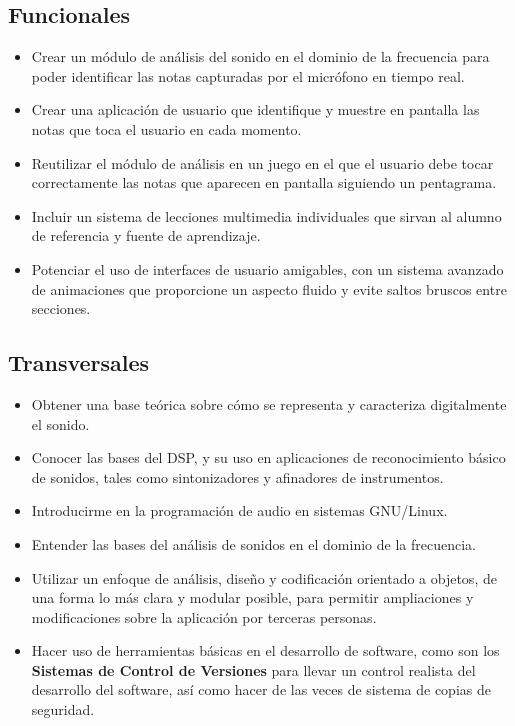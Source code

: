 \subsection{Funcionales}
\begin{itemize}
\item Crear un módulo de análisis del sonido en el dominio de la
  frecuencia para poder identificar las notas capturadas por el
  micrófono en tiempo real.
\item Crear una aplicación de usuario que identifique y muestre en
  pantalla las notas que toca el usuario en cada momento.
\item Reutilizar el módulo de análisis en un juego en el que el
  usuario debe tocar correctamente las notas que aparecen en pantalla
  siguiendo un pentagrama.
\item Incluir un sistema de lecciones multimedia individuales que
  sirvan al alumno de referencia y fuente de aprendizaje.
\item Potenciar el uso de interfaces de usuario amigables, con un
  sistema avanzado de animaciones que proporcione un aspecto fluido y
  evite saltos bruscos entre secciones.
\end{itemize}

\subsection{Transversales}
\begin{itemize}
\item Obtener una base teórica sobre cómo se representa y caracteriza
  digitalmente el sonido.
\item Conocer las bases del \ac{DSP}, y su uso en aplicaciones de
  reconocimiento básico de sonidos, tales como sintonizadores y
  afinadores de instrumentos.
\item Introducirme en la programación de audio en sistemas GNU/Linux.
\item Entender las bases del análisis de sonidos en el dominio de la
  frecuencia. 
\item Utilizar un enfoque de análisis, diseño y codificación orientado
  a objetos, de una forma lo más clara y modular posible, para
  permitir ampliaciones y modificaciones sobre la aplicación por
  terceras personas.
\item Hacer uso de herramientas básicas en el desarrollo de software,
  como son los \textbf{Sistemas de Control de Versiones} para llevar
  un control realista del desarrollo del software, así como hacer de
  las veces de sistema de copias de seguridad.
\end{itemize}


